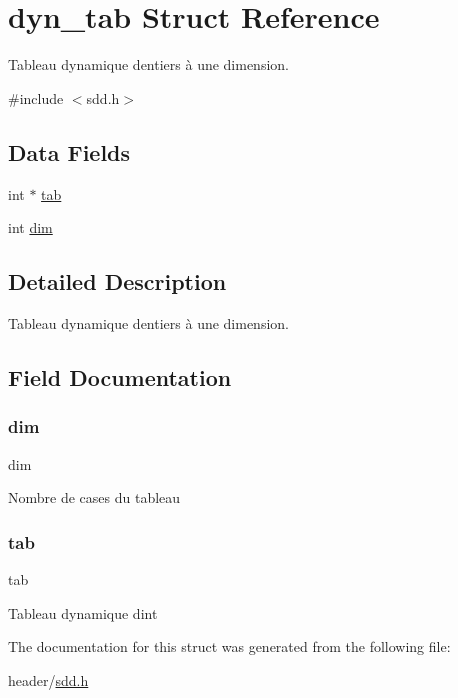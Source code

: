 \hypertarget{structdyn__tab}{}\section{dyn\+\_\+tab Struct Reference}
\label{structdyn__tab}


Tableau dynamique d\textquotesingle{}entiers à une dimension.  




{\ttfamily \#include $<$sdd.\+h$>$}

\subsection*{Data Fields}
\begin{DoxyCompactItemize}
\item 
int $\ast$ \hyperlink{structdyn__tab_af1ffd7c07d3cf727dfbec1ee327606fa}{tab}
\item 
int \hyperlink{structdyn__tab_ae6fa959b9e8f9c638e0d82bf2c7dc5e7}{dim}
\end{DoxyCompactItemize}


\subsection{Detailed Description}
Tableau dynamique d\textquotesingle{}entiers à une dimension. 

\subsection{Field Documentation}
\mbox{\label{structdyn__tab_ae6fa959b9e8f9c638e0d82bf2c7dc5e7}} 
\subsubsection{\texorpdfstring{dim}{dim}}
{\footnotesize\ttfamily dim}

Nombre de cases du tableau \mbox{\label{structdyn__tab_af1ffd7c07d3cf727dfbec1ee327606fa}} 
\subsubsection{\texorpdfstring{tab}{tab}}
{\footnotesize\ttfamily tab}

Tableau dynamique d\textquotesingle{}int 

The documentation for this struct was generated from the following file\+:\begin{DoxyCompactItemize}
\item 
header/\hyperlink{sdd_8h}{sdd.\+h}\end{DoxyCompactItemize}
